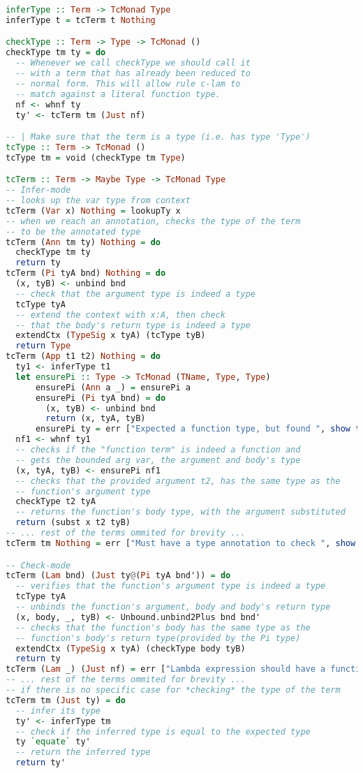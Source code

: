 \begin{lstlisting}[language=Haskell]
inferType :: Term -> TcMonad Type
inferType t = tcTerm t Nothing

checkType :: Term -> Type -> TcMonad ()
checkType tm ty = do
  -- Whenever we call checkType we should call it
  -- with a term that has already been reduced to 
  -- normal form. This will allow rule c-lam to
  -- match against a literal function type.
  nf <- whnf ty
  ty' <- tcTerm tm (Just nf)

-- | Make sure that the term is a type (i.e. has type 'Type')
tcType :: Term -> TcMonad ()
tcType tm = void (checkType tm Type)

tcTerm :: Term -> Maybe Type -> TcMonad Type
-- Infer-mode
-- looks up the var type from context
tcTerm (Var x) Nothing = lookupTy x
-- when we reach an annotation, checks the type of the term
-- to be the annotated type
tcTerm (Ann tm ty) Nothing = do
  checkType tm ty
  return ty
tcTerm (Pi tyA bnd) Nothing = do
  (x, tyB) <- unbind bnd
  -- check that the argument type is indeed a type
  tcType tyA
  -- extend the context with x:A, then check
  -- that the body's return type is indeed a type
  extendCtx (TypeSig x tyA) (tcType tyB)
  return Type
tcTerm (App t1 t2) Nothing = do
  ty1 <- inferType t1
  let ensurePi :: Type -> TcMonad (TName, Type, Type)
      ensurePi (Ann a _) = ensurePi a
      ensurePi (Pi tyA bnd) = do
        (x, tyB) <- unbind bnd
        return (x, tyA, tyB)
      ensurePi ty = err ["Expected a function type, but found ", show ty]
  nf1 <- whnf ty1
  -- checks if the "function term" is indeed a function and
  -- gets the bounded arg var, the argument and body's type
  (x, tyA, tyB) <- ensurePi nf1
  -- checks that the provided argument t2, has the same type as the
  -- function's argument type
  checkType t2 tyA
  -- returns the function's body type, with the argument substituted
  return (subst x t2 tyB)
-- ... rest of the terms ommited for brevity ...
tcTerm tm Nothing = err ["Must have a type annotation to check ", show tm]

-- Check-mode
tcTerm (Lam bnd) (Just ty@(Pi tyA bnd')) = do
  -- verifies that the function's argument type is indeed a type
  tcType tyA
  -- unbinds the function's argument, body and body's return type
  (x, body, _, tyB) <- Unbound.unbind2Plus bnd bnd'
  -- checks that the function's body has the same type as the
  -- function's body's return type(provided by the Pi type)
  extendCtx (TypeSig x tyA) (checkType body tyB)
  return ty
tcTerm (Lam _) (Just nf) = err ["Lambda expression should have a function type, not", show nf]
-- ... rest of the terms ommited for brevity ...
-- if there is no specific case for *checking* the type of the term
tcTerm tm (Just ty) = do
  -- infer its type
  ty' <- inferType tm
  -- check if the inferred type is equal to the expected type
  ty `equate` ty'
  -- return the inferred type
  return ty'
\end{lstlisting}

